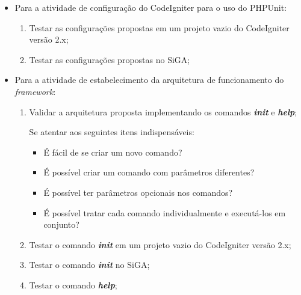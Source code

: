       \begin{itemize}
      
        \item Para a atividade de configuração do CodeIgniter para o uso do PHPUnit:
      
        \begin{enumerate}
          
          \item Testar as configurações propostas em um projeto vazio do CodeIgniter versão 2.x;
          
          \item Testar as configurações propostas no SiGA;
          
        \end{enumerate}
          
        \item Para a atividade de estabelecimento da arquitetura de funcionamento do \textit{framework}:
        
        \begin{enumerate}
    
          \item Validar a arquitetura proposta implementando os comandos \textit{\textbf{init}} e \textit{\textbf{help}};
              
              \subitem Se atentar aos seguintes itens indispensáveis:
            \begin{itemize}
              \item É fácil de se criar um novo comando?
              \item É possível criar um comando com parâmetros diferentes?
              \item É possível ter parâmetros opcionais nos comandos?
              \item É possível tratar cada comando individualmente e executá-los em conjunto?
            \end{itemize}
          
          \item Testar o comando \textit{\textbf{init}} em um projeto vazio do CodeIgniter versão 2.x;
          
          \item Testar o comando \textit{\textbf{init}} no SiGA;
    
          \item Testar o comando \textit{\textbf{help}};
        \end{enumerate}
      
      \end{itemize}
  

